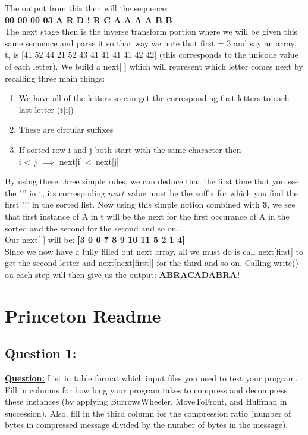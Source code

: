 \documentclass[12pt]{article}
\begin{document}
\noindent The output from this then will the sequence: \\ \textbf{00 00 00 03 A R D ! R C A A A A B B} \\

The next stage then is the inverse transform portion where we will be given this same sequence
and parse it so that way we note that first = 3 and say an array, t, is
[41 52 44 21 52 43 41 41 41 41 42 42] (this corresponds to the unicode value of each letter).
We build a next[ ] which will represent which letter comes next by recalling three main things:
\begin{enumerate}
    \item We have all of the letters so can get the corresponding first letters to each last letter (t[i])
    \item These are circular suffixes
    \item If sorted row i and j both start with the same character then \\ i \textless\ j $\implies$ next[i] \textless\ next[j]
\end{enumerate}
By using these three simple rules, we can deduce that the first time that you see the '!' in t, its
correspoding $next$ value must be the suffix for which you find the first '!' in the sorted list. Now using
this simple notion combined with \textbf{3}, we see that first instance of A in t will be the next for the
first occurance of A in the sorted and the second for the second and so on.  \\
Our next[ ] will be: \textbf{[3 0 6 7 8 9 10 11 5 2 1 4]} \\
\indent Since we now have a fully filled out next array, all we must do is call next[first] to get the
second letter and next[next[first]] for the third and so on. Calling write() on each step will then give us the
output: \textbf{ABRACADABRA!}

\newpage
\section{Princeton Readme}
\subsection{Question 1:}
\underline{\textbf{Question:}} List in table format which input files you used to test your program.
Fill in columns for how long your program takes to compress and
decompress these instances (by applying BurrowsWheeler, MoveToFront,
and Huffman in succession). Also, fill in the third column for
the compression ratio (number of bytes in compressed message
divided by the number of bytes in the message).  \\
\end{document}
